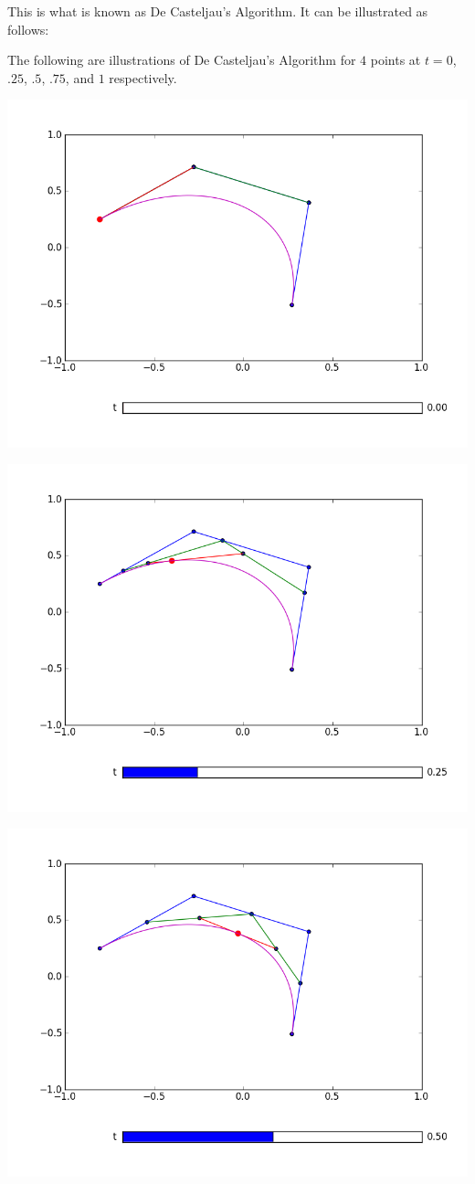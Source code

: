 This is what is known as De Casteljau's Algorithm. It can be illustrated as follows:

The following are illustrations of De Casteljau's Algorithm for $4$ points at $t= 0$, $.25$, $.5$, $.75$, and $1$ respectively.

\includegraphics[width=\textwidth]{decasteljau_1}

\includegraphics[width=\textwidth]{decasteljau_2}

\includegraphics[width=\textwidth]{decasteljau_3}

